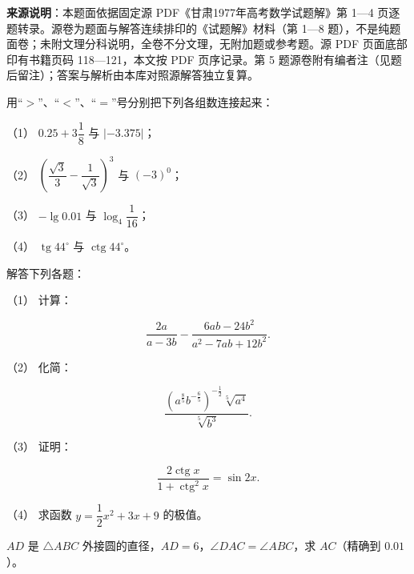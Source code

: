 


\begin{gktip}
\textbf{来源说明}：本题面依据固定源 PDF《甘肃1977年高考数学试题解》第 1—4 页逐题转录。源卷为题面与解答连续排印的《试题解》材料（第 1—8 题），不是纯题面卷；未附文理分科说明，全卷不分文理，无附加题或参考题。源 PDF 页面底部印有书籍页码 118—121，本文按 PDF 页序记录。第 5 题源卷附有编者注（见题后留注）；答案与解析由本库对照源解答独立复算。
\end{gktip}

\par\medskip

\begin{question}
用“$>$”、“$<$”、“$=$”号分别把下列各组数连接起来：

（1） $0.25+3\dfrac{1}{8}$ 与 $|-3.375|$；

（2） $\left(\dfrac{\sqrt{3}}{3}-\dfrac{1}{\sqrt{3}}\right)^{3}$ 与 $(-3)^{0}$；

（3） $-\lg 0.01$ 与 $\log_4\dfrac{1}{16}$；

（4） $\operatorname{tg} 44^\circ$ 与 $\operatorname{ctg} 44^\circ$。

\end{question}
\begin{question}
解答下列各题：

（1） 计算：

\nopagebreak[4]
\[
\frac{2a}{a-3b}-\frac{6ab-24b^2}{a^2-7ab+12b^2}.
\]

（2） 化简：

\nopagebreak[4]
\[
\frac{(a^{\frac{8}{5}}b^{-\frac{6}{5}})^{-\frac{1}{2}}\sqrt[5]{a^4}}{\sqrt[5]{b^3}}.
\]

（3） 证明：

\nopagebreak[4]
\[
\frac{2\operatorname{ctg}x}{1+\operatorname{ctg}^2x}=\sin 2x.
\]

（4） 求函数 $y=\dfrac{1}{2}x^2+3x+9$ 的极值。

\Needspace{0.4\textheight}
\end{question}
\begin{question}
$AD$ 是 $\triangle ABC$ 外接圆的直径，$AD=6$，$\angle DAC=\angle ABC$，求 $AC$（精确到 $0.01$）。
\nopagebreak[4]
\begin{center}\end{center}
\nopagebreak[4]
\Needspace{0.4\textheight}
\end{question}
